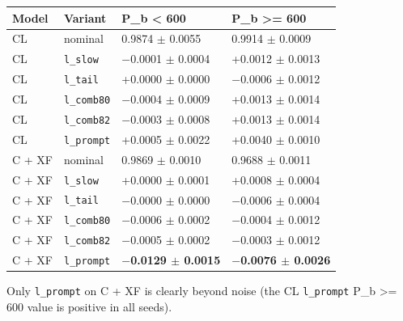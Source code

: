 \documentclass[10pt,a4paper]{article}
\begin{document}
\begin{center}\small
\setlength{\tabcolsep}{3pt}\renewcommand{\arraystretch}{1.15}
\begin{tabularx}{\linewidth}{LLLL}
\toprule
\textbf{Model} & \textbf{Variant} & \textbf{P\_b < 600} & \textbf{P\_b >= 600} \\
\midrule
CL & nominal & 0.9874 $\pm$ 0.0055 & 0.9914 $\pm$ 0.0009 \\
CL & \texttt{l\_\allowbreak{}slow} & $-$0.0001 $\pm$ 0.0004 & +0.0012 $\pm$ 0.0013 \\
CL & \texttt{l\_\allowbreak{}tail} & +0.0000 $\pm$ 0.0000 & $-$0.0006 $\pm$ 0.0012 \\
CL & \texttt{l\_\allowbreak{}comb80} & $-$0.0004 $\pm$ 0.0009 & +0.0013 $\pm$ 0.0014 \\
CL & \texttt{l\_\allowbreak{}comb82} & $-$0.0003 $\pm$ 0.0008 & +0.0013 $\pm$ 0.0014 \\
CL & \texttt{l\_\allowbreak{}prompt} & +0.0005 $\pm$ 0.0022 & +0.0040 $\pm$ 0.0010 \\
C + XF & nominal & 0.9869 $\pm$ 0.0010 & 0.9688 $\pm$ 0.0011 \\
C + XF & \texttt{l\_\allowbreak{}slow} & +0.0000 $\pm$ 0.0001 & +0.0008 $\pm$ 0.0004 \\
C + XF & \texttt{l\_\allowbreak{}tail} & $-$0.0000 $\pm$ 0.0000 & $-$0.0006 $\pm$ 0.0004 \\
C + XF & \texttt{l\_\allowbreak{}comb80} & $-$0.0006 $\pm$ 0.0002 & $-$0.0004 $\pm$ 0.0012 \\
C + XF & \texttt{l\_\allowbreak{}comb82} & $-$0.0005 $\pm$ 0.0002 & $-$0.0003 $\pm$ 0.0012 \\
C + XF & \texttt{l\_\allowbreak{}prompt} & \textbf{$-$0.0129 $\pm$ 0.0015} & \textbf{$-$0.0076 $\pm$ 0.0026} \\
\bottomrule
\end{tabularx}
\end{center}
Only \texttt{l\_\allowbreak{}prompt} on C + XF is clearly beyond noise (the CL \texttt{l\_\allowbreak{}prompt} P\_b >= 600 value is positive in all seeds).
\end{document}

